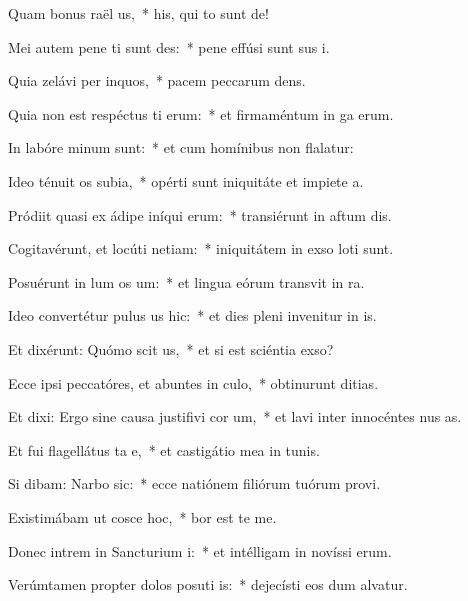 \item Quam bonus raël us,~* his, qui to sunt de!
\item Mei autem pene ti sunt des:~* pene effúsi sunt sus i.
\item Quia zelávi per inquos,~* pacem peccarum dens.
\item Quia non est respéctus ti erum:~* et firmaméntum in ga erum.
\item In labóre minum  sunt:~* et cum homínibus non flalatur:
\item Ideo ténuit os subia,~* opérti sunt iniquitáte et impiete a.
\item Pródiit quasi ex ádipe iníqui erum:~* transiérunt in aftum dis.
\item Cogitavérunt, et locúti  netiam:~* iniquitátem in exso loti sunt.
\item Posuérunt in lum os um:~* et lingua eórum transvit in ra.
\item Ideo convertétur pulus us hic:~* et dies pleni invenitur in is.
\item Et dixérunt: Quómo scit us,~* et si est sciéntia  exso?
\item Ecce ipsi peccatóres, et abuntes in culo,~* obtinurunt ditias.
\item Et dixi: Ergo sine causa justifivi cor um,~* et lavi inter innocéntes nus as.
\item Et fui flagellátus ta e,~* et castigátio mea in tunis.
\item Si dibam: Narbo sic:~* ecce natiónem filiórum tuórum provi.
\item Existimábam ut cosce hoc,~* bor est te me.
\item Donec intrem in Sancturium i:~* et intélligam in novíssi erum.
\item Verúmtamen propter dolos posuti is:~* dejecísti eos dum alvatur.
